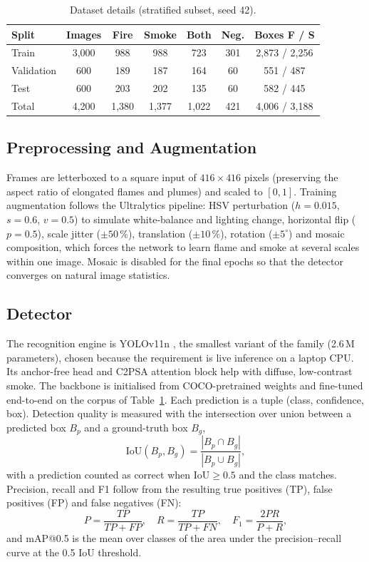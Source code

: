 \documentclass[conference]{IEEEtran}
\begin{document}
\begin{table}[t]
\caption{Dataset details (stratified subset, seed 42).}
\label{tab:data}
\centering
\scriptsize
\setlength{\tabcolsep}{3.5pt}
\begin{tabular}{lcccccc}
\toprule
\textbf{Split} & \textbf{Images} & \textbf{Fire} & \textbf{Smoke} & \textbf{Both} & \textbf{Neg.} & \textbf{Boxes F / S} \\
\midrule
Train & 3{,}000 & 988 & 988 & 723 & 301 & 2{,}873 / 2{,}256 \\
Validation & 600 & 189 & 187 & 164 & 60 & 551 / 487 \\
Test & 600 & 203 & 202 & 135 & 60 & 582 / 445 \\
\midrule
Total & 4{,}200 & 1{,}380 & 1{,}377 & 1{,}022 & 421 & 4{,}006 / 3{,}188 \\
\bottomrule
\end{tabular}
\end{table}

\subsection{Preprocessing and Augmentation}
Frames are letterboxed to a square input of $416\times416$ pixels (preserving the aspect ratio of elongated flames and plumes) and scaled to $[0,1]$. Training augmentation follows the Ultralytics pipeline: HSV perturbation ($h=0.015$, $s=0.6$, $v=0.5$) to simulate white-balance and lighting change, horizontal flip ($p=0.5$), scale jitter ($\pm50\,\%$), translation ($\pm10\,\%$), rotation ($\pm5^{\circ}$) and mosaic composition, which forces the network to learn flame and smoke at several scales within one image. Mosaic is disabled for the final epochs so that the detector converges on natural image statistics.

\subsection{Detector}
The recognition engine is YOLOv11n \cite{khanam2024yolov11}, the smallest variant of the family (2.6\,M parameters), chosen because the requirement is live inference on a laptop CPU. Its anchor-free head and C2PSA attention block help with diffuse, low-contrast smoke. The backbone is initialised from COCO-pretrained weights and fine-tuned end-to-end on the corpus of Table~\ref{tab:data}. Each prediction is a tuple (class, confidence, box). Detection quality is measured with the intersection over union between a predicted box $B_p$ and a ground-truth box $B_g$,
\begin{equation}
\mathrm{IoU}(B_p,B_g)=\frac{|B_p\cap B_g|}{|B_p\cup B_g|},
\label{eq:iou}
\end{equation}
with a prediction counted as correct when $\mathrm{IoU}\ge0.5$ and the class matches. Precision, recall and F1 follow from the resulting true positives (TP), false positives (FP) and false negatives (FN):
\begin{equation}
P=\frac{TP}{TP+FP},\quad R=\frac{TP}{TP+FN},\quad F_1=\frac{2PR}{P+R},
\label{eq:prf}
\end{equation}
and mAP@0.5 is the mean over classes of the area under the precision--recall curve at the 0.5 IoU threshold.
\end{document}
